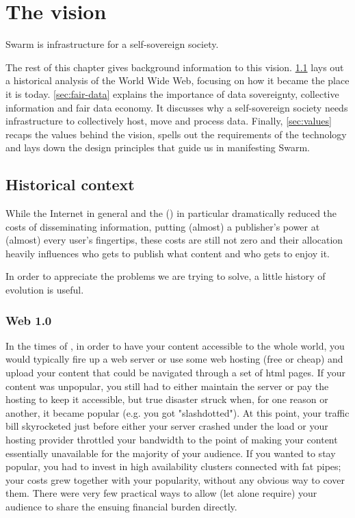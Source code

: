\chapter{The vision}\label{chap:vision}

Swarm is infrastructure for a self-sovereign society.  

The rest of this chapter gives background information to this vision. \ref{sec:historical_context} lays out a historical analysis of the World Wide Web, focusing on how it became the place it is today.
\ref{sec:fair-data} explains the importance of data sovereignty, collective  information and fair data economy. It discusses why a self-sovereign society needs infrastructure to collectively host, move and process data.
Finally, \ref{sec:values} recaps the values behind the vision, spells out the requirements of the  technology and lays down the design principles that guide us in manifesting Swarm.

\section{Historical context}\label{sec:historical_context}
\green{}
While the Internet in general and the  () in particular dramatically reduced the costs of disseminating information, putting (almost) a publisher's power at (almost) every user's fingertips, these costs are still not zero and their allocation heavily influences who gets to publish what content and who gets to enjoy it.

In order to appreciate the problems we are trying to solve, a little history of  evolution is useful.

\subsection{Web 1.0}\label{sec:web_1}

In the times of , in order to have your content accessible to the whole world, you would typically fire up a web server or use some web hosting (free or cheap) and upload your content that could be navigated through a set of html pages. If your content was unpopular, you still had to either maintain the server or pay the hosting to keep it accessible, but true disaster struck when, for one reason or another, it became popular (e.g. you got "slashdotted"). At this point, your traffic bill skyrocketed just before either your server crashed under the load or your hosting provider throttled your bandwidth to the point of making your content essentially unavailable for the majority of your audience. If you wanted to stay popular, you had to invest in high availability clusters connected with fat pipes; your costs grew together with your popularity, without any obvious way to cover them. There were very few practical ways to allow (let alone require) your audience to share the ensuing financial burden directly.


